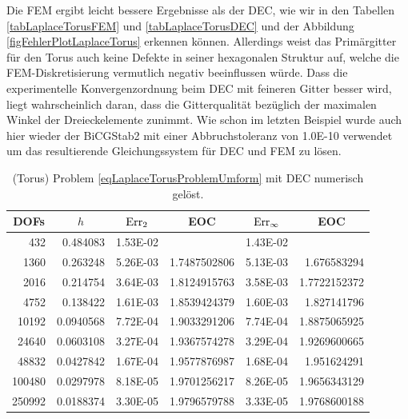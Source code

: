 \begin{beispiel}[Torus]
      Die FEM ergibt leicht bessere Ergebnisse als der DEC, wie wir in den Tabellen \ref{tabLaplaceTorusFEM}
      und \ref{tabLaplaceTorusDEC} und der Abbildung \ref{figFehlerPlotLaplaceTorus} erkennen können.
      Allerdings weist das Primärgitter für den Torus auch keine Defekte in seiner hexagonalen Struktur
      auf, welche die FEM-Diskretisierung vermutlich negativ beeinflussen würde.
      Dass die experimentelle Konvergenzordnung beim DEC mit feineren Gitter besser wird, 
      liegt wahrscheinlich daran, dass die Gitterqualität bezüglich der maximalen Winkel der Dreieckelemente zunimmt.
      Wie schon im letzten Beispiel wurde auch hier wieder der BiCGStab2 mit einer Abbruchstoleranz von
      1.0E-10 verwendet um das resultierende Gleichungssystem für DEC und FEM zu lösen.

       \begin{table}[htbp]
       \centering
       \begin{tabular}{|r|r|r|r|r|r|}
       \hline
       \multicolumn{1}{|c|}{DOFs} & \multicolumn{1}{c|}{\( h \)} & \multicolumn{1}{c|}{\( \text{Err}_{2} \)} & \multicolumn{1}{c|}{EOC} &
       \multicolumn{1}{c|}{ \( \text{Err}_{\infty} \)} & \multicolumn{1}{c|}{EOC} \\ \hline
        432 & 0.484083 & 1.53E-02 & \multicolumn{1}{l|}{} & 1.43E-02 & \multicolumn{1}{l|}{} \\ \hline
        1360 & 0.263248 & 5.26E-03 & 1.7487502806 & 5.13E-03 & 1.676583294 \\ \hline
        2016 & 0.214754 & 3.64E-03 & 1.8124915763 & 3.58E-03 & 1.7722152372 \\ \hline
        4752 & 0.138422 & 1.61E-03 & 1.8539424379 & 1.60E-03 & 1.827141796 \\ \hline
        10192 & 0.0940568 & 7.72E-04 & 1.9033291206 & 7.74E-04 & 1.8875065925 \\ \hline
        24640 & 0.0603108 & 3.27E-04 & 1.9367574278 & 3.29E-04 & 1.9269600665 \\ \hline
        48832 & 0.0427842 & 1.67E-04 & 1.9577876987 & 1.68E-04 & 1.951624291 \\ \hline
        100480 & 0.0297978 & 8.18E-05 & 1.9701256217 & 8.26E-05 & 1.9656343129 \\ \hline
        250992 & 0.0188374 & 3.30E-05 & 1.9796579788 & 3.33E-05 & 1.9768600188 \\ \hline
       \end{tabular}
       \caption[Laplace auf Torus (DEC)]{(Torus) Problem \eqref{eqLaplaceTorusProblemUmform} mit DEC numerisch gelöst.}

\end{table}
\end{beispiel}
